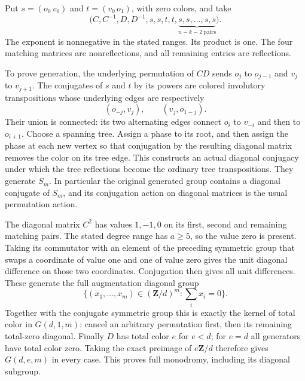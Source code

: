 Put $s=(o_0\,v_0)$ and $t=(v_0\,o_1)$, with zero colors,
and take
\begin{equation}
 \bigl(C,C^{-1},D,D^{-1},s,s,t,t,
          \underbrace{s,s,\ldots,s,s}_{n-k-2\ \mathrm{pairs}}\bigr).
                                                        \tag{I20.12}
\end{equation}
The exponent is nonnegative in the stated ranges. Its product
is one. The four matching matrices are nonreflections, and
all remaining entries are reflections.

To prove generation, the underlying permutation of $CD$ sends
$o_j$ to $o_{j-1}$ and $v_j$ to $v_{j+1}$. The conjugates of
$s$ and $t$ by its powers are colored involutory transpositions
whose underlying edges are respectively
\[
            (o_{-j},v_j),\qquad (v_j,o_{1-j}).
\]
Their union is connected: its two alternating edges connect
$o_i$ to $v_{-i}$ and then to $o_{i+1}$. Choose a spanning
tree. Assign a phase to its root, and then assign the phase
at each new vertex so that conjugation by the resulting
diagonal matrix removes the color on its tree edge. This
constructs an actual diagonal conjugacy under which the tree
reflections become the ordinary tree transpositions. They
generate $S_m$. In particular the original generated group
contains a diagonal conjugate of $S_m$, and its conjugation
action on diagonal matrices is the usual permutation action.

The diagonal matrix $C^2$ has values $1,-1,0$ on its first,
second and remaining matching pairs. The stated degree range
has $a\geq5$, so the value zero is present. Taking its
commutator with an element of the preceding symmetric group
that swaps a coordinate of value one and one of value zero
gives the unit diagonal difference on those two coordinates.
Conjugation then gives all unit differences. These generate
the full augmentation diagonal group
\[
        \{(x_1,\ldots,x_m)\in(\mathbf Z/d)^m:
                                          \textstyle\sum_i x_i=0\}.
\]
Together with the conjugate symmetric group this is exactly
the kernel of total color in $G(d,1,m)$: cancel an arbitrary
permutation first, then its remaining total-zero diagonal.
Finally $D$ has total color $e$ for $e<d$; for $e=d$ all
generators have total color zero. Taking the exact preimage
of $e\mathbf Z/d$ therefore gives $G(d,e,m)$ in every case.
This proves full monodromy, including its diagonal subgroup.

